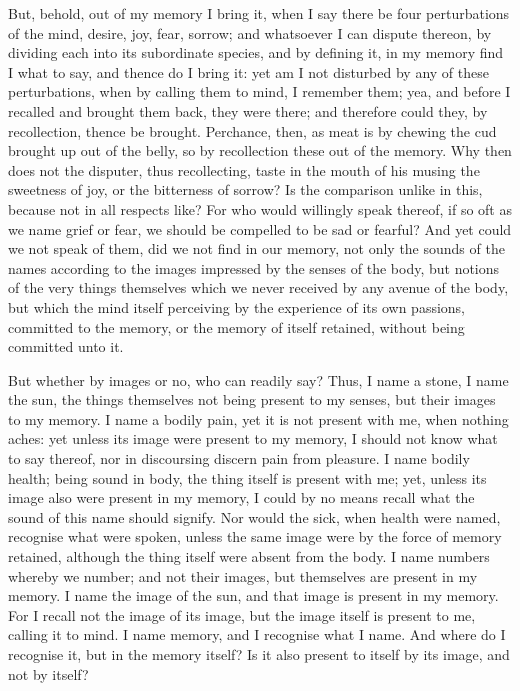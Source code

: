 \documentclass[b5paper,openright,12pt,twoside]{book}
\begin{document}
But, behold, out of my memory I bring it, when I say there be four
perturbations of the mind, desire, joy, fear, sorrow; and whatsoever I
can dispute thereon, by dividing each into its subordinate species, and
by defining it, in my memory find I what to say, and thence do I bring
it: yet am I not disturbed by any of these perturbations, when by
calling them to mind, I remember them; yea, and before I recalled
and brought them back, they were there; and therefore could they, by
recollection, thence be brought. Perchance, then, as meat is by chewing
the cud brought up out of the belly, so by recollection these out of the
memory. Why then does not the disputer, thus recollecting, taste in the
mouth of his musing the sweetness of joy, or the bitterness of sorrow?
Is the comparison unlike in this, because not in all respects like? For
who would willingly speak thereof, if so oft as we name grief or fear,
we should be compelled to be sad or fearful? And yet could we not speak
of them, did we not find in our memory, not only the sounds of the names
according to the images impressed by the senses of the body, but notions
of the very things themselves which we never received by any avenue of
the body, but which the mind itself perceiving by the experience of its
own passions, committed to the memory, or the memory of itself retained,
without being committed unto it.

But whether by images or no, who can readily say? Thus, I name a stone,
I name the sun, the things themselves not being present to my senses,
but their images to my memory. I name a bodily pain, yet it is not
present with me, when nothing aches: yet unless its image were present
to my memory, I should not know what to say thereof, nor in discoursing
discern pain from pleasure. I name bodily health; being sound in body,
the thing itself is present with me; yet, unless its image also were
present in my memory, I could by no means recall what the sound of
this name should signify. Nor would the sick, when health were named,
recognise what were spoken, unless the same image were by the force of
memory retained, although the thing itself were absent from the body. I
name numbers whereby we number; and not their images, but themselves
are present in my memory. I name the image of the sun, and that image is
present in my memory. For I recall not the image of its image, but the
image itself is present to me, calling it to mind. I name memory, and
I recognise what I name. And where do I recognise it, but in the memory
itself? Is it also present to itself by its image, and not by itself?
\end{document}
